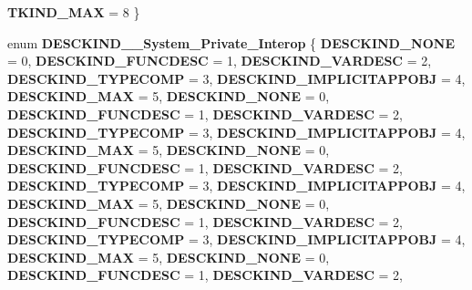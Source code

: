 \begin{DoxyCompactItemize}
\newline
{\bfseries T\+K\+I\+N\+D\+\_\+\+M\+AX} = 8
 \}
\item 
\mbox{\label{namespace_system_1_1_runtime_1_1_interop_services_1_1_com_types_aa5b48e3d71ce8cd59e7daf1cf1292fc6}} 
enum {\bfseries D\+E\+S\+C\+K\+I\+N\+D\+\_\+\+\_\+\+System\+\_\+\+Private\+\_\+\+Interop} \{ \newline
{\bfseries D\+E\+S\+C\+K\+I\+N\+D\+\_\+\+N\+O\+NE} = 0, 
{\bfseries D\+E\+S\+C\+K\+I\+N\+D\+\_\+\+F\+U\+N\+C\+D\+E\+SC} = 1, 
{\bfseries D\+E\+S\+C\+K\+I\+N\+D\+\_\+\+V\+A\+R\+D\+E\+SC} = 2, 
{\bfseries D\+E\+S\+C\+K\+I\+N\+D\+\_\+\+T\+Y\+P\+E\+C\+O\+MP} = 3, 
\newline
{\bfseries D\+E\+S\+C\+K\+I\+N\+D\+\_\+\+I\+M\+P\+L\+I\+C\+I\+T\+A\+P\+P\+O\+BJ} = 4, 
{\bfseries D\+E\+S\+C\+K\+I\+N\+D\+\_\+\+M\+AX} = 5, 
{\bfseries D\+E\+S\+C\+K\+I\+N\+D\+\_\+\+N\+O\+NE} = 0, 
{\bfseries D\+E\+S\+C\+K\+I\+N\+D\+\_\+\+F\+U\+N\+C\+D\+E\+SC} = 1, 
\newline
{\bfseries D\+E\+S\+C\+K\+I\+N\+D\+\_\+\+V\+A\+R\+D\+E\+SC} = 2, 
{\bfseries D\+E\+S\+C\+K\+I\+N\+D\+\_\+\+T\+Y\+P\+E\+C\+O\+MP} = 3, 
{\bfseries D\+E\+S\+C\+K\+I\+N\+D\+\_\+\+I\+M\+P\+L\+I\+C\+I\+T\+A\+P\+P\+O\+BJ} = 4, 
{\bfseries D\+E\+S\+C\+K\+I\+N\+D\+\_\+\+M\+AX} = 5, 
\newline
{\bfseries D\+E\+S\+C\+K\+I\+N\+D\+\_\+\+N\+O\+NE} = 0, 
{\bfseries D\+E\+S\+C\+K\+I\+N\+D\+\_\+\+F\+U\+N\+C\+D\+E\+SC} = 1, 
{\bfseries D\+E\+S\+C\+K\+I\+N\+D\+\_\+\+V\+A\+R\+D\+E\+SC} = 2, 
{\bfseries D\+E\+S\+C\+K\+I\+N\+D\+\_\+\+T\+Y\+P\+E\+C\+O\+MP} = 3, 
\newline
{\bfseries D\+E\+S\+C\+K\+I\+N\+D\+\_\+\+I\+M\+P\+L\+I\+C\+I\+T\+A\+P\+P\+O\+BJ} = 4, 
{\bfseries D\+E\+S\+C\+K\+I\+N\+D\+\_\+\+M\+AX} = 5, 
{\bfseries D\+E\+S\+C\+K\+I\+N\+D\+\_\+\+N\+O\+NE} = 0, 
{\bfseries D\+E\+S\+C\+K\+I\+N\+D\+\_\+\+F\+U\+N\+C\+D\+E\+SC} = 1, 
\newline
{\bfseries D\+E\+S\+C\+K\+I\+N\+D\+\_\+\+V\+A\+R\+D\+E\+SC} = 2, 
{\bfseries D\+E\+S\+C\+K\+I\+N\+D\+\_\+\+T\+Y\+P\+E\+C\+O\+MP} = 3, 
{\bfseries D\+E\+S\+C\+K\+I\+N\+D\+\_\+\+I\+M\+P\+L\+I\+C\+I\+T\+A\+P\+P\+O\+BJ} = 4, 
{\bfseries D\+E\+S\+C\+K\+I\+N\+D\+\_\+\+M\+AX} = 5, 
\newline
{\bfseries D\+E\+S\+C\+K\+I\+N\+D\+\_\+\+N\+O\+NE} = 0, 
{\bfseries D\+E\+S\+C\+K\+I\+N\+D\+\_\+\+F\+U\+N\+C\+D\+E\+SC} = 1, 
{\bfseries D\+E\+S\+C\+K\+I\+N\+D\+\_\+\+V\+A\+R\+D\+E\+SC} = 2, 

\end{DoxyCompactItemize}
